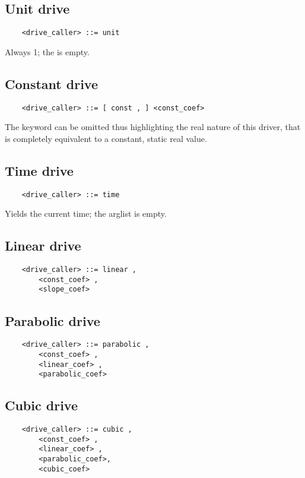 \subsection{Unit drive}
\begin{verbatim}
    <drive_caller> ::= unit
\end{verbatim}
Always 1; the  is empty.

\subsection{Constant drive}
\begin{verbatim}
    <drive_caller> ::= [ const , ] <const_coef>                    
\end{verbatim}
The keyword  can be omitted thus highlighting the real nature
of this driver, that is completely equivalent to a constant, static real
value.

\subsection{Time drive}
\begin{verbatim}
    <drive_caller> ::= time
\end{verbatim}
Yields the current time; the arglist is empty.
  
\subsection{Linear drive}
\begin{verbatim}
    <drive_caller> ::= linear ,
        <const_coef> ,
        <slope_coef>
\end{verbatim}

\subsection{Parabolic drive}
\begin{verbatim}
    <drive_caller> ::= parabolic ,
        <const_coef> , 
        <linear_coef> , 
        <parabolic_coef>
\end{verbatim}

\subsection{Cubic drive}
\begin{verbatim}
    <drive_caller> ::= cubic ,
        <const_coef> , 
        <linear_coef> ,
        <parabolic_coef>, 
        <cubic_coef>
\end{verbatim}

